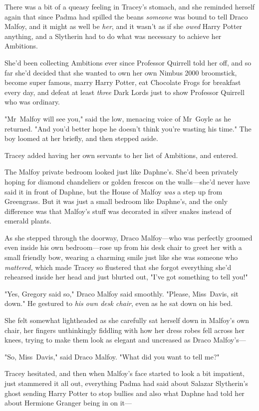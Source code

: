 There was a bit of a queasy feeling in Tracey's stomach, and she reminded
herself again that since Padma had spilled the beans \emph{someone} was bound
to tell Draco Malfoy, and it might as well be \emph{her}, and it wasn't as if
she \emph{owed} Harry Potter anything, and a Slytherin had to do what was
necessary to achieve her Ambitions.

She'd been collecting Ambitions ever since Professor Quirrell told her off, and
so far she'd decided that she wanted to own her own Nimbus 2000 broomstick,
become super famous, marry Harry Potter, eat Chocolate Frogs for breakfast
every day, and defeat at least \emph{three} Dark Lords just to show Professor
Quirrell who was ordinary.

"Mr~Malfoy will see you," said the low, menacing voice of Mr~Goyle as he
returned. "And you'd better hope he doesn't think you're wasting his time." The
boy loomed at her briefly, and then stepped aside.

Tracey added having her own servants to her list of Ambitions, and entered.

The Malfoy private bedroom looked just like Daphne's. She'd been privately
hoping for diamond chandeliers or golden frescos on the walls—she'd never
have said it in front of Daphne, but the House of Malfoy \emph{was} a step up
from Greengrass. But it was just a small bedroom like Daphne's, and the only
difference was that Malfoy's stuff was decorated in silver snakes instead of
emerald plants.

As she stepped through the doorway, Draco Malfoy—who was perfectly groomed
even inside his own bedroom—rose up from his desk chair to greet her with a
small friendly bow, wearing a charming smile just like she was someone who
\emph{mattered,} which made Tracey so flustered that she forgot everything
she'd rehearsed inside her head and just blurted out, "I've got something to
tell you!"

"Yes, Gregory said so," Draco Malfoy said smoothly. "Please, Miss~Davis, sit
down." He gestured to \emph{his own desk chair}, even as he sat down on his bed.

She felt somewhat lightheaded as she carefully sat herself down in Malfoy's own
chair, her fingers unthinkingly fiddling with how her dress robes fell across
her knees, trying to make them look as elegant and uncreased as Draco
Malfoy's—

"So, Miss~Davis," said Draco Malfoy. "What did you want to tell me?"

Tracey hesitated, and then when Malfoy's face started to look a bit impatient,
just stammered it all out, everything Padma had said about Salazar Slytherin's
ghost sending Harry Potter to stop bullies and also what Daphne had told her
about Hermione Granger being in on it—

